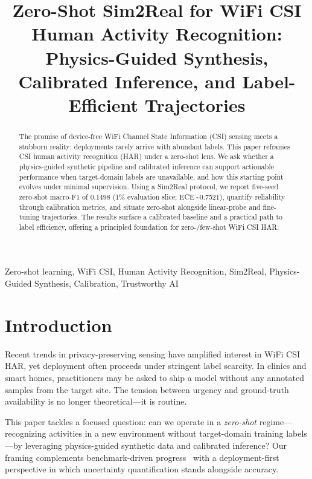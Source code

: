 \documentclass[journal]{IEEEtran}
\begin{document}
\title{Zero-Shot Sim2Real for WiFi CSI Human Activity Recognition: Physics-Guided Synthesis, Calibrated Inference, and Label-Efficient Trajectories}

\author{
}

\maketitle

\begin{abstract}
The promise of device-free WiFi Channel State Information (CSI) sensing meets a stubborn reality: deployments rarely arrive with abundant labels. This paper reframes CSI human activity recognition (HAR) under a zero-shot lens. We ask whether a physics-guided synthetic pipeline and calibrated inference can support actionable performance when target-domain labels are unavailable, and how this starting point evolves under minimal supervision. Using a Sim2Real protocol, we report five-seed zero-shot macro-F1 of 0.1498 (1\% evaluation slice; ECE\,\textasciitilde0.7521), quantify reliability through calibration metrics, and situate zero-shot alongside linear-probe and fine-tuning trajectories. The results surface a calibrated baseline and a practical path to label efficiency, offering a principled foundation for zero-/few-shot WiFi CSI HAR.
\end{abstract}

\begin{IEEEkeywords}
Zero-shot learning, WiFi CSI, Human Activity Recognition, Sim2Real, Physics-Guided Synthesis, Calibration, Trustworthy AI
\end{IEEEkeywords}

\section{Introduction}
Recent trends in privacy-preserving sensing have amplified interest in WiFi CSI HAR, yet deployment often proceeds under stringent label scarcity. In clinics and smart homes, practitioners may be asked to ship a model without any annotated samples from the target site. The tension between urgency and ground-truth availability is no longer theoretical—it is routine.

This paper tackles a focused question: can we operate in a \emph{zero-shot} regime—recognizing activities in a new environment without target-domain training labels—by leveraging physics-guided synthetic data and calibrated inference? Our framing complements benchmark-driven progress~\cite{yang2023sensefi} with a deployment-first perspective in which uncertainty quantification stands alongside accuracy.
\end{document}
